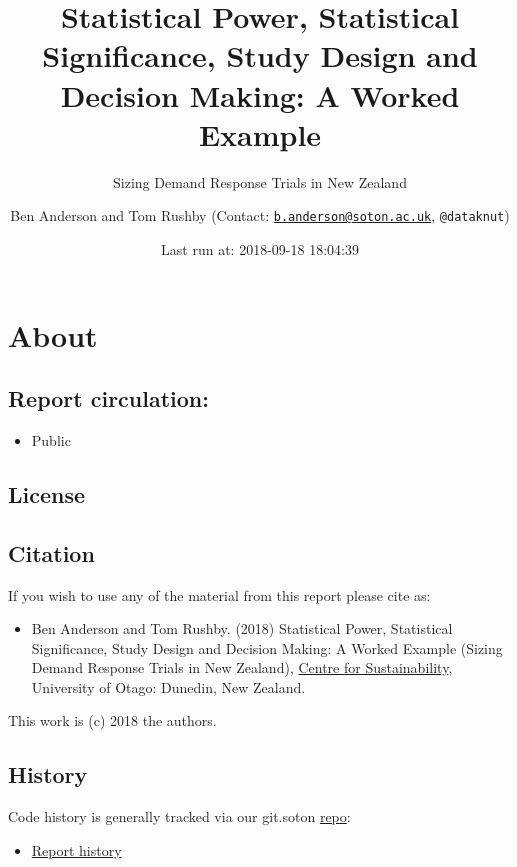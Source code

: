 \documentclass[]{article}
\title{Statistical Power, Statistical Significance, Study Design and Decision
Making: A Worked Example}
\subtitle{Sizing Demand Response Trials in New Zealand}
\author{Ben Anderson and Tom Rushby (Contact:
\href{mailto:b.anderson@soton.ac.uk}{\nolinkurl{b.anderson@soton.ac.uk}},
\texttt{@dataknut})}
\date{Last run at: 2018-09-18 18:04:39}
\providecommand{\tightlist}{%
  \setlength{\itemsep}{0pt}\setlength{\parskip}{0pt}}
\theoremstyle{definition}
\theoremstyle{definition}
\theoremstyle{definition}
\theoremstyle{remark}
\begin{document}
\maketitle

{
\setcounter{tocdepth}{2}
\tableofcontents
}
\newpage

\section{About}\label{about}

\subsection{Report circulation:}\label{report-circulation}

\begin{itemize}
\tightlist
\item
  Public
\end{itemize}

\subsection{License}\label{license}

\subsection{Citation}\label{citation}

If you wish to use any of the material from this report please cite as:

\begin{itemize}
\tightlist
\item
  Ben Anderson and Tom Rushby. (2018) Statistical Power, Statistical
  Significance, Study Design and Decision Making: A Worked Example
  (Sizing Demand Response Trials in New Zealand),
  \href{http://www.otago.ac.nz/centre-sustainability/}{Centre for
  Sustainability}, University of Otago: Dunedin, New Zealand.
\end{itemize}

This work is (c) 2018 the authors.

\subsection{History}\label{history}

Code history is generally tracked via our git.soton
\href{https://github.com/CfSOtago/GREENGrid}{repo}:

\begin{itemize}
\tightlist
\item
  \href{https://github.com/CfSOtago/GREENGrid/commits/master/analysis/powerAnalysis}{Report
  history}
\end{itemize}
\end{document}
